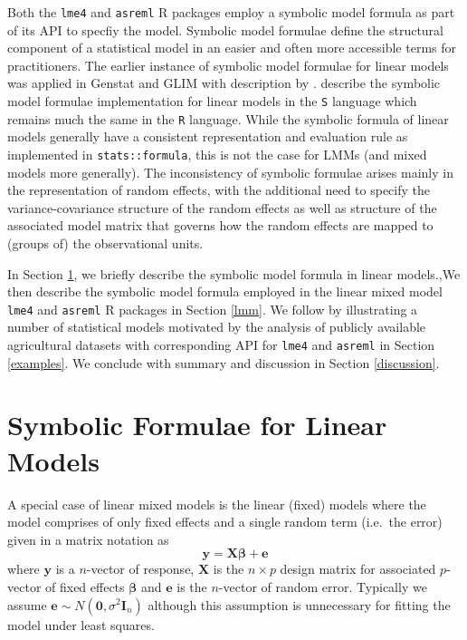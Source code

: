 \documentclass[runningheads]{llncs}
\begin{document}
Both the \texttt{lme4} and \texttt{asreml} R packages employ a symbolic model formula as part of its API to specfiy the model. Symbolic model formulae define the structural component of a statistical model in an easier and often more accessible terms for practitioners. The earlier instance of symbolic model formulae for linear models was applied in Genstat \autocite{genstat} and GLIM \autocite{GLIM} with description by \textcite{Wilkinson1973}. \textcite{Chambers1993} describe the symbolic model formulae implementation for linear models in the \texttt{S} language which remains much the same in the \texttt{R} language. While the symbolic formula of linear models generally have a consistent representation and evaluation rule as implemented in \texttt{stats::formula}, this is not the case for LMMs (and mixed models more generally). The inconsistency of symbolic formulae arises mainly in the representation of random effects, with the additional need to specify the variance-covariance structure of the random effects as well as structure of the associated model matrix that governs how the random effects are mapped to (groups of) the observational units.

In Section \ref{lm}, we briefly describe the symbolic model formula in linear models.,We then describe the symbolic model formula employed in the linear mixed model \texttt{lme4} and \texttt{asreml} R packages in Section \ref{lmm}. We follow by illustrating a number of statistical models motivated by the analysis of publicly available agricultural datasets with corresponding API for \texttt{lme4} and \texttt{asreml} in Section \ref{examples}. We conclude with summary and discussion in Section \ref{discussion}.

\hypertarget{lm}{%
\section{Symbolic Formulae for Linear Models}\label{lm}}

A special case of linear mixed models is the linear (fixed) models where the model comprises of only fixed effects and a single random term (i.e.~the error) given in a matrix notation as
\begin{equation}
\boldsymbol{y} = \mathbf{X}\boldsymbol{\beta} + \boldsymbol{e}\label{eq:lm}
\end{equation}
where \(\boldsymbol{y}\) is a \(n\)-vector of response, \(\mathbf{X}\) is the \(n\times p\) design matrix for associated \(p\)-vector of fixed effects \(\boldsymbol{\beta}\) and \(\boldsymbol{e}\) is the \(n\)-vector of random error. Typically we assume \(\boldsymbol{e} \sim N(\boldsymbol{0}, \sigma^2\mathbf{I}_n)\) although this assumption is unnecessary for fitting the model under least squares.
\end{document}
